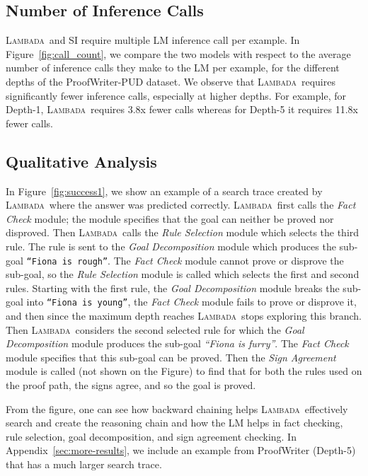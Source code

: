 \documentclass[11pt]{article}
\newcommand{\algo}{\textsc{Lambada}}
\newcommand{\module}[1]{\emph{#1}}
\begin{document}
\subsection{Number of Inference Calls}
\algo\ and SI require multiple LM inference call per example. In Figure~\ref{fig:call_count}, we compare the two models with respect to the average number of inference calls they make to the LM per example, for the different depths of the ProofWriter-PUD dataset. We observe that \algo\ requires significantly fewer inference calls, especially at higher depths. For example, for Depth-1, \algo\ requires 3.8x fewer calls whereas for Depth-5 it requires 11.8x fewer calls.  

\subsection{Qualitative Analysis}
In Figure~\ref{fig:success1}, we show an example of a search trace created by \algo\ where the answer was predicted correctly. 
\algo\ first calls the \module{Fact Check} module; the module specifies that the goal can neither be proved nor disproved. Then \algo\ calls the \module{Rule Selection} module which selects the third rule. The rule is sent to the \module{Goal Decomposition} module which produces the sub-goal \texttt{``Fiona is rough''}. The \module{Fact Check} module cannot prove or disprove the sub-goal, so the \module{Rule Selection} module is called which selects the first and second rules. Starting with the first rule, the \module{Goal Decomposition} module breaks the sub-goal into \texttt{``Fiona is young''}, the \module{Fact Check} module fails to prove or disprove it, and then since the maximum depth reaches \algo\ stops exploring this branch. Then \algo\ considers the second selected rule for which the \module{Goal Decomposition} module produces the sub-goal \module{``Fiona is furry''}. The \module{Fact Check} module specifies that this sub-goal can be proved. Then the \module{Sign Agreement} module is called (not shown on the Figure) to find that for both the rules used on the proof path, the signs agree, and so the goal is proved.

From the figure, one can see how backward chaining helps \algo\ effectively search and create the reasoning chain and how the LM helps in fact checking, rule selection, goal decomposition, and sign agreement checking. In Appendix~\ref{sec:more-results}, we include an example from ProofWriter (Depth-5) that has a much larger search trace.
\end{document}
